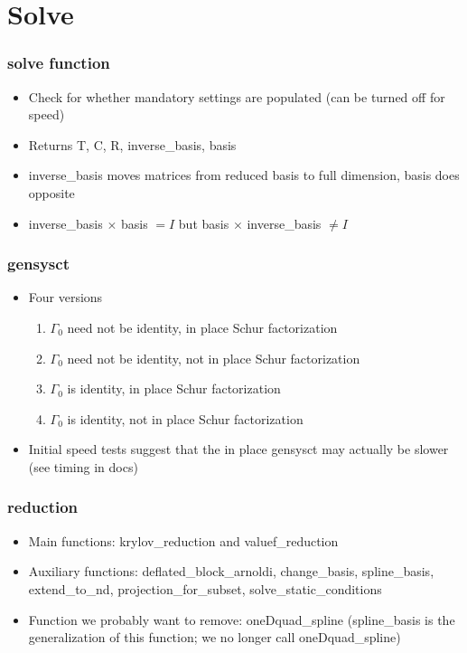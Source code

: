 \documentclass{beamer}
\begin{document}
\section{Solve}
\begin{frame}
  \frametitle{solve function}
\begin{itemize}
\item Check for whether mandatory settings are populated (can be turned off for speed)
\item Returns T, C, R, inverse\_basis, basis
\item inverse\_basis moves matrices from reduced basis to full dimension, basis does opposite
\item inverse\_basis $\times$ basis $ = I$ but basis $\times$ inverse\_basis $\neq I$
\end{itemize}
\end{frame}
\begin{frame}
  \frametitle{gensysct}
\begin{itemize}
\item Four versions
  \begin{enumerate}
  \item $\Gamma_0$ need not be identity, in place Schur factorization
  \item $\Gamma_0$ need not be identity, not in place Schur factorization
  \item $\Gamma_0$ is identity, in place Schur factorization
  \item $\Gamma_0$ is identity, not in place Schur factorization
  \end{enumerate}
\item Initial speed tests suggest that the in place gensysct may actually be slower (see timing in docs)
\end{itemize}
\end{frame}
\begin{frame}
  \frametitle{reduction}
\begin{itemize}
\item Main functions: krylov\_reduction and valuef\_reduction
\item Auxiliary functions: deflated\_block\_arnoldi, change\_basis, spline\_basis, extend\_to\_nd, projection\_for\_subset, solve\_static\_conditions
\item Function we probably want to remove: oneDquad\_spline (spline\_basis is the generalization of this function; we no longer call oneDquad\_spline)
\end{itemize}
\end{frame}
\end{document}
